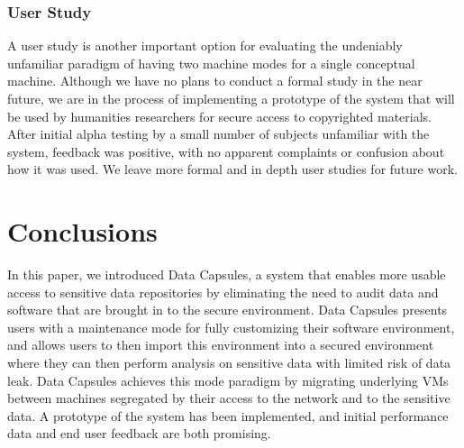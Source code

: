 \documentclass{acm_proc_article-sp}
\begin{document}
\subsubsection{User Study}

A user study is another important option for evaluating the undeniably
unfamiliar paradigm of having two machine modes for a single conceptual machine.
Although we have no plans to conduct a formal study in the near future, we are
in the process of implementing a prototype of the system that will be used by
humanities researchers for secure access to copyrighted materials.  After
initial alpha testing by a small number of subjects unfamiliar with the system,
feedback was positive, with no apparent complaints or confusion about how it was
used.  We leave more formal and in depth user studies for future work.

\section{Conclusions}

In this paper, we introduced Data Capsules, a system that enables more usable
access to sensitive data repositories by eliminating the need to audit data and
software that are brought in to the secure environment.  Data Capsules presents
users with a maintenance mode for fully customizing their software environment,
and allows users to then import this environment into a secured environment
where they can then perform analysis on sensitive data with limited risk of data
leak.  Data Capsules achieves this mode paradigm by migrating underlying VMs
between machines segregated by their access to the network and to the sensitive
data.  A prototype of the system has been implemented, and initial performance
data and end user feedback are both promising.



\end{document}
